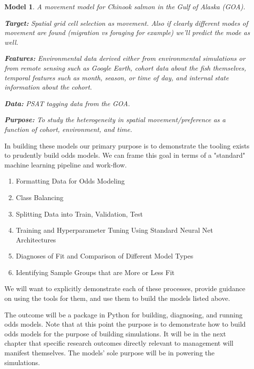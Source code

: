 \documentclass[11pt]{article}
\newtheorem{model}{Model}
\begin{document}
\begin{model}
A movement model for Chinook salmon in the Gulf of Alaska (GOA). \newline

\textbf{Target:} Spatial grid cell selection as movement. Also if clearly different modes of movement are found (migration vs foraging for example) we'll predict the mode as well. \newline

\textbf{Features:} Environmental data derived either from environmental simulations or from remote sensing such as Google Earth, cohort data about the fish themselves, temporal features such as month, season, or time of day, and internal state information about the cohort. \newline

\textbf{Data:} PSAT tagging data from the GOA. \newline

\textbf{Purpose:} To study the heterogeneity in spatial movement/preference as a function of cohort, environment, and time.\newline

\end{model}

In building these models our primary purpose is to demonstrate the tooling exists to prudently build odds models. We can frame this goal in terms of a "standard" machine learning pipeline and work-flow. 

\begin{enumerate}
\item Formatting Data for Odds Modeling 
\item Class Balancing
\item Splitting Data into Train, Validation, Test
\item Training and Hyperparameter Tuning Using Standard Neural Net Architectures
\item Diagnoses of Fit and Comparison of Different Model Types
\item Identifying Sample Groups that are More or Less Fit
\end{enumerate}

We will want to explicitly demonstrate each of these processes, provide guidance on using the tools for them, and use them to build the models listed above. \newline

The outcome will be a package in Python for building, diagnosing, and running odds models. Note that at this point the purpose is to demonstrate how to build odds models for the purpose of building simulations. It will be in the next chapter that specific research outcomes directly relevant to management will manifest themselves. The models' sole purpose will be in powering the simulations. 
\end{document}
